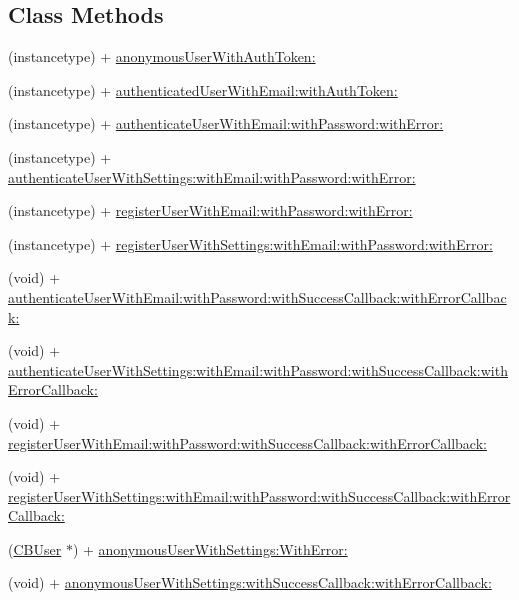 \subsection*{Class Methods}
\begin{DoxyCompactItemize}
\item 
(instancetype) + \hyperlink{interface_c_b_user_af932ff5e8e7cf2614e223b8bb1040e5d}{anonymous\+User\+With\+Auth\+Token\+:}
\item 
(instancetype) + \hyperlink{interface_c_b_user_ac45cec16ef019ff7d160864c0b73b3a3}{authenticated\+User\+With\+Email\+:with\+Auth\+Token\+:}
\item 
(instancetype) + \hyperlink{interface_c_b_user_a3196760e01e3215f93cd2fab8e515bc9}{authenticate\+User\+With\+Email\+:with\+Password\+:with\+Error\+:}
\item 
(instancetype) + \hyperlink{interface_c_b_user_adab8bc298bccc0892dbb431b3bd6b72e}{authenticate\+User\+With\+Settings\+:with\+Email\+:with\+Password\+:with\+Error\+:}
\item 
(instancetype) + \hyperlink{interface_c_b_user_a87de9d5282ea3a1b1f400cc5e31a8100}{register\+User\+With\+Email\+:with\+Password\+:with\+Error\+:}
\item 
(instancetype) + \hyperlink{interface_c_b_user_a8ee4f3073a9360c5829abb300234477c}{register\+User\+With\+Settings\+:with\+Email\+:with\+Password\+:with\+Error\+:}
\item 
(void) + \hyperlink{interface_c_b_user_a00b1b4b1ba436b1081b92d9c50d42da0}{authenticate\+User\+With\+Email\+:with\+Password\+:with\+Success\+Callback\+:with\+Error\+Callback\+:}
\item 
(void) + \hyperlink{interface_c_b_user_ad4295bcc046be1b9b988f52757e6253b}{authenticate\+User\+With\+Settings\+:with\+Email\+:with\+Password\+:with\+Success\+Callback\+:with\+Error\+Callback\+:}
\item 
(void) + \hyperlink{interface_c_b_user_a3b2eced573b27bdc4bbf6d1401cc74d9}{register\+User\+With\+Email\+:with\+Password\+:with\+Success\+Callback\+:with\+Error\+Callback\+:}
\item 
(void) + \hyperlink{interface_c_b_user_a5cd8d3c8cabe7988dc70237903bafae9}{register\+User\+With\+Settings\+:with\+Email\+:with\+Password\+:with\+Success\+Callback\+:with\+Error\+Callback\+:}
\item 
(\hyperlink{interface_c_b_user}{C\+B\+User} $\ast$) + \hyperlink{interface_c_b_user_aaa5d3708c50ffc320fb80c92faeba4ef}{anonymous\+User\+With\+Settings\+:\+With\+Error\+:}
\item 
(void) + \hyperlink{interface_c_b_user_a177e50a6f6fd1bae2e9bae9a6ad073e6}{anonymous\+User\+With\+Settings\+:with\+Success\+Callback\+:with\+Error\+Callback\+:}
\end{DoxyCompactItemize}
